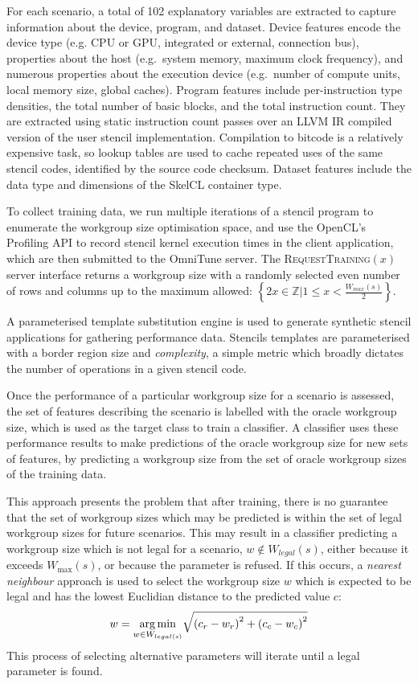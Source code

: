 \documentclass[nonatbib,preprint,9pt]{sigplanconf}
\begin{document}
For each scenario, a total of 102 explanatory variables are extracted
to capture information about the device, program, and dataset. Device
features encode the device type (e.g. CPU or GPU, integrated or
external, connection bus), properties about the host (e.g.\ system
memory, maximum clock frequency), and numerous properties about the
execution device (e.g.\ number of compute units, local memory size,
global caches). Program features include per-instruction type
densities, the total number of basic blocks, and the total instruction
count. They are extracted using static instruction count passes over
an LLVM IR compiled version of the user stencil
implementation. Compilation to bitcode is a relatively expensive task,
so lookup tables are used to cache repeated uses of the same stencil
codes, identified by the source code checksum. Dataset features
include the data type and dimensions of the SkelCL container type.

To collect training data, we run multiple iterations of a stencil
program to enumerate the workgroup size optimisation space, and use
the OpenCL's Profiling API to record stencil kernel execution times in
the client application, which are then submitted to the OmniTune
server. The \textsc{RequestTraining}$(x)$ server interface returns a
workgroup size with a randomly selected even number of rows and
columns up to the maximum allowed:
$\left\{ 2x \in \mathbb{Z} | 1 \le x < \frac{W_{max}(s)}{2} \right\}$.

A parameterised template substitution engine is used to generate
synthetic stencil applications for gathering performance
data. Stencils templates are parameterised with a border region size
and \emph{complexity}, a simple metric which broadly dictates the
number of operations in a given stencil code.

Once the performance of a particular workgroup size for a scenario is
assessed, the set of features describing the scenario is labelled with
the oracle workgroup size, which is used as the target class to train
a classifier. A classifier uses these performance results to make
predictions of the oracle workgroup size for new sets of features, by
predicting a workgroup size from the set of oracle workgroup sizes of
the training data.

This approach presents the problem that after training, there is no
guarantee that the set of workgroup sizes which may be predicted is
within the set of legal workgroup sizes for future scenarios. This may
result in a classifier predicting a workgroup size which is not legal
for a scenario, $w \not\in W_{legal}(s)$, either because it exceeds
$W_{\max}(s)$, or because the parameter is refused. If this occurs, a
\emph{nearest neighbour} approach is used to select the workgroup size
$w$ which is expected to be legal and has the lowest Euclidian
distance to the predicted value $c$:
%
\begin{equation}
  w = \underset{w \in W_{legal(s)}}{\operatorname*{arg\,min}} \sqrt{\left(c_r - w_r\right)^2 + \left(c_c - w_c\right)^2}
\end{equation}
%
This process of selecting alternative parameters will iterate until a
legal parameter is found.
\end{document}

